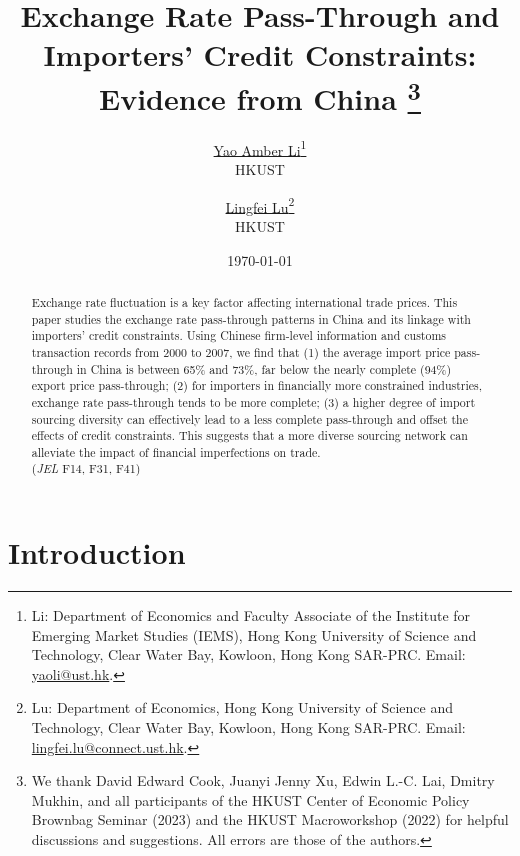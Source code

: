 \documentclass[12pt]{article}
\begin{document}
\title{  \Large \textbf{Exchange Rate Pass-Through and Importers' Credit Constraints: Evidence from China} 
\thanks{We thank David Edward Cook, Juanyi Jenny Xu, Edwin L.-C. Lai, Dmitry Mukhin, and all participants of the HKUST Center of Economic Policy Brownbag Seminar (2023) and the HKUST Macroworkshop (2022) for helpful discussions and suggestions. All errors are those of the authors.}}

\author{\large \href{http://yaoli.people.ust.hk/}{Yao Amber Li}\thanks{Li: Department of Economics and Faculty Associate of the Institute for Emerging Market Studies (IEMS), Hong Kong University of Science and Technology, Clear Water Bay, Kowloon, Hong Kong SAR-PRC. Email: \href{mailto:yaoli@ust.hk}{yaoli@ust.hk}.}\\ \large{HKUST}
\and \large \href{}{Lingfei Lu}\thanks{Lu: Department of Economics, Hong Kong University of Science and Technology, Clear Water Bay, Kowloon, Hong Kong SAR-PRC. Email: \href{mailto:}{lingfei.lu@connect.ust.hk}.} \\ \large{HKUST}
 }

\date{\today }

\maketitle

\begin{abstract}
Exchange rate fluctuation is a key factor affecting international trade prices. This paper studies the exchange rate pass-through patterns in China and its linkage with importers' credit constraints. Using Chinese firm-level information and customs transaction records from 2000 to 2007, we find that (1) the average import price pass-through in China is between 65\% and 73\%, far below the nearly complete (94\%) export price pass-through; (2) for importers in financially more constrained industries, exchange rate pass-through tends to be more complete; (3) a higher degree of import sourcing diversity can effectively lead to a less complete pass-through and offset the effects of credit constraints. This suggests that a more diverse sourcing network can alleviate the impact of financial imperfections on trade.\\
(\textit{JEL} F14, F31, F41)

\end{abstract}

\section{Introduction} \label{Introduction}
\end{document}

